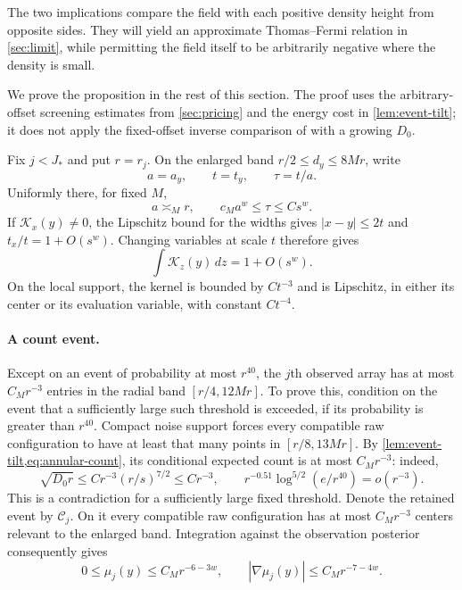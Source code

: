 The two implications compare the field with each positive density height
from opposite sides.  They will yield an approximate Thomas--Fermi relation
in \cref{sec:limit}, while permitting the field itself to be arbitrarily
negative where the density is small.

We prove the proposition in the rest of this section.  The proof uses the
arbitrary-offset screening estimates from \cref{sec:pricing} and the energy
cost in \cref{lem:event-tilt}; it does not apply the fixed-offset inverse
comparison of \cite[\FFixedOffset]{Foundation} with a growing $D_0$.

Fix $j<J_*$ and put $r=r_j$.  On the enlarged band
$r/2\leq d_y\leq8Mr$, write
\[
 a=a_y,\qquad t=t_y,\qquad \tau=t/a.
\]
Uniformly there, for fixed $M$,
\begin{equation}
 a\asymp_M r,\qquad c_Ma^w\leq\tau\leq Cs^w.
 \label{eq:packet-scale-ratios}
\end{equation}
If $\mathcal K_x(y)\ne0$, the Lipschitz bound for the widths gives
$|x-y|\leq2t$ and $t_x/t=1+O(s^w)$.  Changing variables at scale $t$
therefore gives
\begin{equation}
 \int\mathcal K_z(y)\,dz=1+O(s^w).
 \label{eq:packet-approximate-mass}
\end{equation}
On the local support, the kernel is bounded by $Ct^{-3}$ and is Lipschitz,
in either its center or its evaluation variable, with constant $Ct^{-4}$.

\paragraph{A count event.}
Except on an event of probability at most $r^{40}$, the $j$th observed
array has at most $C_Mr^{-3}$ entries in the radial band
$[r/4,12Mr]$.  To prove this, condition on the event that a sufficiently
large such threshold is exceeded, if its probability is greater than
$r^{40}$.  Compact noise support forces every compatible raw
configuration to have at least that many points in $[r/8,13Mr]$.
By \cref{lem:event-tilt,eq:annular-count}, its conditional expected count
is at most $C_Mr^{-3}$: indeed,
\[
 \sqrt{D_0r}\leq Cr^{-3}(r/s)^{7/2}\leq Cr^{-3},\qquad
 r^{-0.51}\log^{5/2}(e/r^{40})=o(r^{-3}).
\]
This is a contradiction for a sufficiently large fixed threshold.
Denote the retained event by $\mathcal C_j$.  On it every compatible raw
configuration has at most $C_Mr^{-3}$ centers relevant to the enlarged
band.  Integration against the observation posterior consequently gives
\begin{equation}
 0\leq\mu_j(y)\leq C_Mr^{-6-3w},\qquad
 |\nabla\mu_j(y)|\leq C_Mr^{-7-4w}.
 \label{eq:conditional-density-bounds}
\end{equation}

